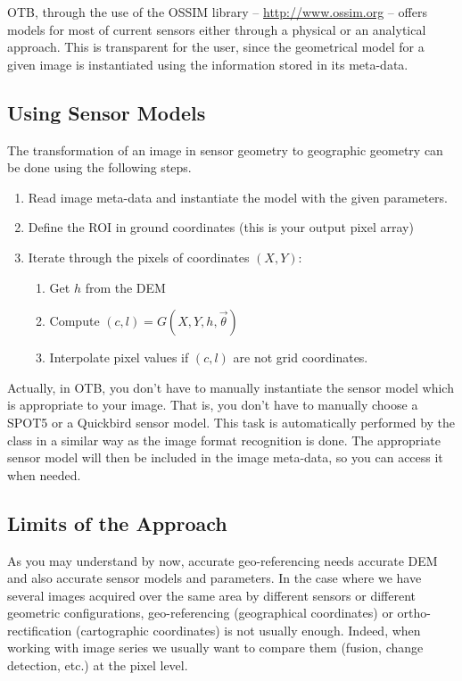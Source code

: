 OTB, through the use of the OSSIM library --
\url{http://www.ossim.org} -- offers models for most of current
sensors either through a physical or an analytical approach. This is
transparent for the user, since the geometrical model for a given
image is instantiated using the information stored in its meta-data.\\

\subsection{Using Sensor Models}
\label{sec:UsingSensorModels}

The transformation of an image in sensor geometry to geographic
geometry can be done using the following steps.
  \begin{enumerate}
    \item Read image meta-data and instantiate the model with the
    given parameters.
  \item Define the ROI in ground coordinates (this is your output
  pixel array)
  \item Iterate through the pixels of coordinates $(X,Y)$:
    \begin{enumerate}
      \item Get $h$ from the DEM
      \item Compute $(c,l) = G(X,Y,h,\vec\theta)$
      \item Interpolate pixel values if $(c,l)$ are not grid coordinates.
    \end{enumerate}
  \end{enumerate}

Actually, in OTB, you don't have to manually instantiate the sensor
model which is appropriate to your image. That is, you don't have to
manually choose a SPOT5 or a Quickbird sensor model. This task is
automatically performed by the  class in
a similar way as the image format recognition is done. The appropriate
sensor model will then be included in the image meta-data, so you can
access it when needed.

\ifitkFullVersion

\fi



\subsection{Limits of the Approach}
\label{LimitsoftheApproach}

As you may understand by now, accurate geo-referencing needs accurate
DEM and also accurate sensor models and parameters. In the case where
we have several images acquired over the same area by different
sensors or different geometric configurations, geo-referencing (geographical coordinates) or ortho-rectification
(cartographic coordinates) is not usually enough. Indeed, when working
with image series we usually want to compare them (fusion, change
detection, etc.) at the pixel level.\\

